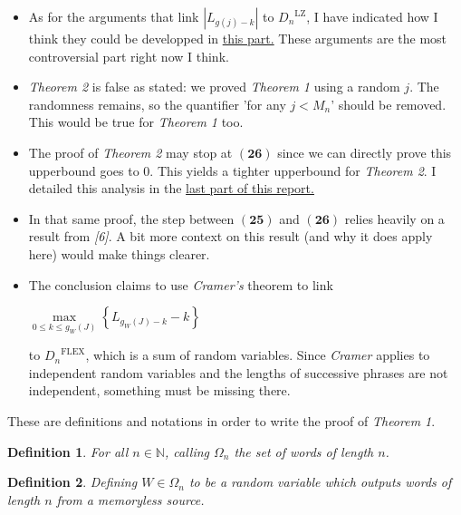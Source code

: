 \documentclass[11pt]{article}
\newtheorem{df}{Definition}
\newcommand{\question}[2][3]{%
	{\centering%
	\noindent\fbox{\bfseries#2}}\raggedright}%
\newcommand{\numero}[1]{\mathbf{(#1)}}
\newcommand{\centers}[2][2]{
    \begin{center}
    {#2}\end{center}}
\begin{document}
\begin{itemize}
\item As for the arguments that 
      link $|L_{g(j)-k}|$ to ${D_n}^{\text{LZ}}$, I have
      indicated how I think they could be developped in 
      \hyperlink{critics}{this part.} These arguments
      are the most controversial part right now I think.

\item \emph{Theorem 2} is false as stated: we proved \emph{Theorem 1}
      using a random $j$. The randomness remains, so the quantifier
      'for any $j < M_n$' should be removed. This would be true for 
      \emph{Theorem 1} too.

\item The proof of \emph{Theorem 2} may stop at $\numero{26}$
      since we can directly prove this upperbound goes to $0$.
      This yields a tighter upperbound for \emph{Theorem 2}.
      I detailed this analysis in the 
      \hyperlink{upperbound}{last part of this report.}

\item In that same proof, the step between $\numero{25}$ and 
      $\numero{26}$ relies heavily on a result from \emph{[6]}.
      A bit more context on this result (and why it does apply here)
      would make things clearer.

\item The conclusion claims to use \emph{Cramer's} theorem to link
      \centers{$\underset{ 0 \leq k \leq g_{\scriptscriptstyle W}(J) }{ \max } 
                    \left\{ { L_{g_{\scriptscriptstyle W}(J)-k} - k } \right\}$}
      to ${D_n}^{\text{FLEX}}$, which is a sum of random variables.
      Since \emph{Cramer} applies to independent random variables and the 
      lengths of successive phrases are not independent, something must be missing 
      there. 
      
\end{itemize}\hypertarget{definitions}{\centers{\question{Notations}}}

\noindent
These are definitions and notations in order
to write the proof of \emph{Theorem 1}.

\begin{df}
For all $n\in\mathbb{N}$, calling $\Omega_n$ the set 
of words of length $n$.
\end{df}

\begin{df}
Defining $W \in \Omega_n$ to be a random variable which outputs 
words of length $n$ from a memoryless source.
\end{df}
\end{document}
